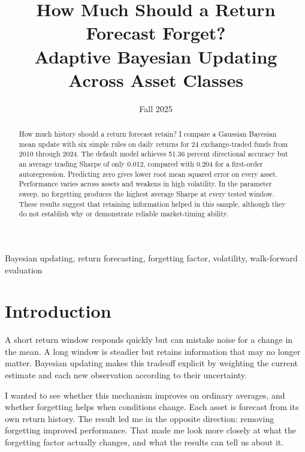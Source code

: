 \documentclass[conference]{IEEEtran}
\date{Fall 2025}
\begin{document}
\raggedbottom

\title{How Much Should a Return Forecast Forget?\\
Adaptive Bayesian Updating Across Asset Classes}
\author{
}
\maketitle

\begin{abstract}
How much history should a return forecast retain? I compare a Gaussian Bayesian mean update with six simple rules on daily returns for 24 exchange-traded funds from 2010 through 2024. The default model achieves 51.36 percent directional accuracy but an average trading Sharpe of only 0.012, compared with 0.204 for a first-order autoregression. Predicting zero gives lower root mean squared error on every asset. Performance varies across assets and weakens in high volatility. In the parameter sweep, no forgetting produces the highest average Sharpe at every tested window. These results suggest that retaining information helped in this sample, although they do not establish why or demonstrate reliable market-timing ability.

\end{abstract}

\begin{IEEEkeywords}
Bayesian updating, return forecasting, forgetting factor, volatility, walk-forward evaluation
\end{IEEEkeywords}

\section{Introduction}
A short return window responds quickly but can mistake noise for a change in the mean. A long window is steadier but retains information that may no longer matter. Bayesian updating makes this tradeoff explicit by weighting the current estimate and each new observation according to their uncertainty.

I wanted to see whether this mechanism improves on ordinary averages, and whether forgetting helps when conditions change. Each asset is forecast from its own return history. The result led me in the opposite direction: removing forgetting improved performance. That made me look more closely at what the forgetting factor actually changes, and what the results can tell us about it.
\end{document}
